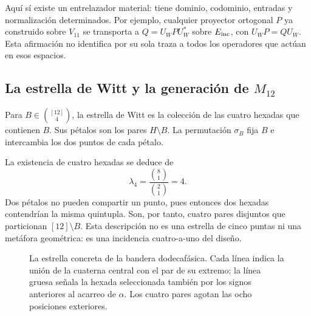 Aquí sí existe un entrelazador material: tiene dominio, codominio,
entradas y normalización determinados. Por ejemplo, cualquier
proyector ortogonal $P$ ya construido sobre $V_{11}$ se transporta a
$Q=U_WPU_W^*$ sobre $E_{\rm inc}$, con
$U_WP=QU_W$. Esta afirmación no identifica por su sola traza a todos
los operadores que actúan en esos espacios.

\subsection{La estrella de Witt y la generación de \texorpdfstring{$M_{12}$}{M12}}
\label{exc:estrella}

\begin{definition}
\label{exc:def-estrella}
Para $B\in\binom{[12]}4$, la estrella de Witt es la colección de las
cuatro hexadas que contienen $B$. Sus pétalos son los pares $H\setminus B$.
La permutación $\sigma_B$ fija $B$ e intercambia los dos puntos de cada
pétalo.
\end{definition}

La existencia de cuatro hexadas se deduce de
\[
 \lambda_4=\frac{\binom81}{\binom21}=4.
\]
Dos pétalos no pueden compartir un punto, pues entonces dos hexadas
contendrían la misma quintupla. Son, por tanto, cuatro pares disjuntos
que particionan $[12]\setminus B$. Esta descripción no es una estrella
de cinco puntas ni una metáfora geométrica: es una incidencia
cuatro-a-uno del diseño.

\begin{figure}[htbp]
\centering
{}
\caption{La estrella concreta de la bandera dodecafásica. Cada línea
indica la unión de la cuaterna central con el par de su extremo; la
línea gruesa señala la hexada seleccionada también por los signos
anteriores al acarreo de $\alpha$. Los cuatro pares agotan las ocho
posiciones exteriores.}
\label{exc:fig-estrella}
\end{figure}

